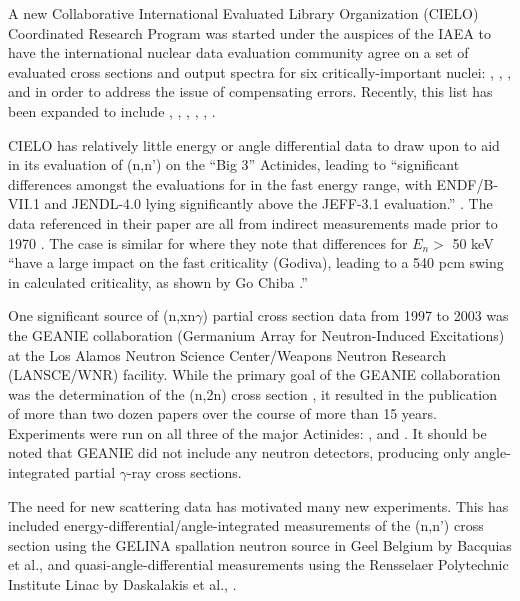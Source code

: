 \documentclass[letterpaper]{ar-1col}
\begin{document}
A new Collaborative International Evaluated Library Organization (CIELO) Coordinated Research Program was started under the auspices of the IAEA \cite{Cha18a} to have the international nuclear data evaluation community agree on a set of evaluated cross sections and output spectra for six critically-important nuclei: , , ,  and  in order to address the issue of compensating errors.  Recently, this list has been expanded to include , , , , , .

CIELO has relatively little energy or angle differential data to draw upon to aid in its evaluation of (n,n') on the \enquote{Big 3} Actinides, leading to \enquote{significant differences amongst the evaluations for  in the fast energy range, with ENDF/B-VII.1 and JENDL-4.0 lying significantly above the JEFF-3.1 evaluation.} \cite{Cha14}.  The  data referenced in their paper are all from indirect measurements made prior to 1970 \cite{Batchelor1969, Andreev1961}.  The case is similar for  where they note that differences for $E_n >$ 50 keV \enquote{have a large impact on the fast criticality (Godiva), leading to a 540 pcm swing in calculated criticality, as shown by Go Chiba \cite{Chi12}.}

One significant source of (n,xn$\gamma$) partial cross section data from 1997 to 2003 was the GEANIE collaboration (Germanium Array for Neutron-Induced Excitations) at the Los Alamos Neutron Science Center/Weapons Neutron Research (LANSCE/WNR) facility. While the primary goal of the GEANIE collaboration was the determination of the (n,2n) cross section \cite{Ber02}, it resulted in the publication of more than two dozen papers over the course of more than 15 years.  Experiments were run on all three of the major Actinides:  \cite{You01},  \cite{Ber02} and  \cite{Fot04}.  It should be noted that GEANIE did not include any neutron detectors, producing only angle-integrated partial $\gamma$-ray cross sections.  

The need for new scattering data has motivated many new experiments.  This has included energy-differential/angle-integrated measurements of the (n,n') cross section using the GELINA spallation neutron source in Geel Belgium by Bacquias et al., \cite{Nem13} and quasi-angle-differential measurements using the Rensselaer Polytechnic Institute Linac by Daskalakis et al., \cite{Das14}. 
\end{document}
